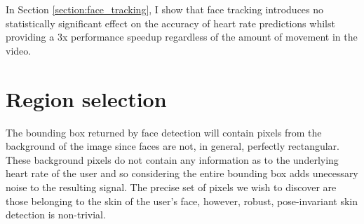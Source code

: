 \\\\
In Section \ref{section:face_tracking}, I show that face tracking introduces no statistically significant effect on the accuracy of heart rate predictions whilst providing a 3x performance speedup regardless of the amount of movement in the video.

\section{Region selection}
\label{ref:region_selection_impl}
The bounding box returned by face detection will contain pixels from the background of 
the image since faces are not, in general, perfectly rectangular. 
These background pixels do not contain any information as to the underlying heart rate of the user and so considering the entire bounding box adds unecessary noise to the resulting signal.
The precise set of pixels we wish to discover are those belonging to the skin of the user's face, however, robust, pose-invariant skin detection is non-trivial.

